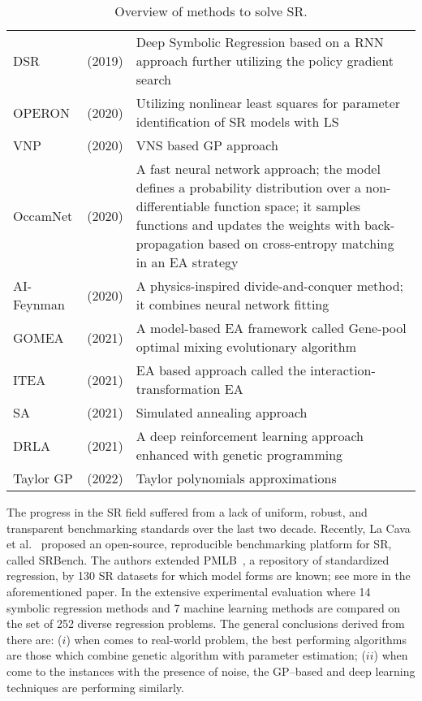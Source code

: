 \documentclass[a4paper,12pt]{elsarticle}
\begin{document}
\begin{table}[!ht]
{\begin{tabularx}{550pt}{l  l  X}
	       DSR  & \cite{petersen2019deep} (2019) & Deep Symbolic Regression based on a RNN approach further utilizing the policy gradient search \\
	       OPERON & \cite{kommenda2020parameter} (2020) &  Utilizing nonlinear least squares for parameter identification of SR models with LS \\
	       VNP    & \cite{elleuch2020variable} (2020) & VNS based GP approach \\
	       OccamNet & \cite{costa2020fast} (2020) &   A fast neural network approach; the model defines a probability distribution over a non-differentiable function space; it samples functions and updates the weights with back-propagation  based on cross-entropy matching in an EA strategy	 \\
	       
	       AI-Feynman  & \cite{udrescu2020ai} (2020) & A physics-inspired divide-and-conquer method; it  combines neural network fitting \\
	             GOMEA  & \cite{virgolin2021improving} (2021)    & A model-based
	       EA framework called Gene-pool optimal mixing evolutionary algorithm \\
	       ITEA & \cite{de2021interaction} (2021)   & EA based approach called the interaction-transformation EA   \\
	       SA & \cite{kantor2021simulated} (2021) &  Simulated annealing approach \\
	       
         DRLA & \cite{mundhenk2021symbolic} (2021)  &    A deep reinforcement learning approach enhanced with genetic programming \\
            Taylor GP &  \cite{he2022taylor} (2022)  &  Taylor polynomials approximations  \\ \hline
         

	\end{tabularx} }
		\caption{Overview of methods to solve SR.}
		\label{tab:gp-based}
	\end{table}
 
  
	The progress in the SR field suffered from a lack of uniform, robust, and transparent
	benchmarking standards over the last two decade. Recently, La Cava et al.~\cite{la2021contemporary} proposed an
	open-source, reproducible benchmarking platform for SR, called SRBench. The authors extended  PMLB~\cite{olson2017pmlb},  a repository of standardized regression, by 130 SR datasets for which model forms are known; see more in the aforementioned paper. In the extensive experimental evaluation  where 14
	symbolic regression methods and 7 machine learning methods are compared on the  set of 252 diverse
    regression problems. The general conclusions derived from there are: ($i$) when comes to real-world problem, the best performing algorithms are those which combine genetic algorithm with parameter estimation; ($ii$) when come to the instances with the presence of noise, the GP--based and deep learning techniques are performing similarly. 
    
\end{document}
